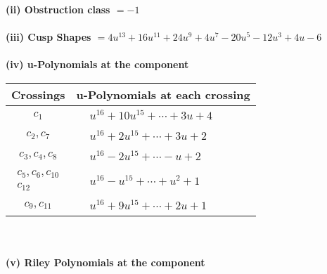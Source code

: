 \documentclass[1p]{elsarticle_modified}
\theoremstyle{definition}
\begin{document}
\flushleft \textbf{(ii) Obstruction class $= -1$}\\~\\
\flushleft \textbf{(iii) Cusp Shapes $= 4 u^{13}+16 u^{11}+24 u^9+4 u^7-20 u^5-12 u^3+4 u-6$}\\~\\
\newpage\renewcommand{\arraystretch}{1}
\flushleft \textbf{(iv) u-Polynomials at the component}\newline \\
\begin{tabular}{m{50pt}|m{274pt}}
Crossings & \hspace{64pt}u-Polynomials at each crossing \\
\hline $$\begin{aligned}c_{1}\end{aligned}$$&$\begin{aligned}
&u^{16}+10 u^{15}+\cdots+3 u+4
\end{aligned}$\\
\hline $$\begin{aligned}c_{2},c_{7}\end{aligned}$$&$\begin{aligned}
&u^{16}+2 u^{15}+\cdots+3 u+2
\end{aligned}$\\
\hline $$\begin{aligned}c_{3},c_{4},c_{8}\end{aligned}$$&$\begin{aligned}
&u^{16}-2 u^{15}+\cdots- u+2
\end{aligned}$\\
\hline $$\begin{aligned}c_{5},c_{6},c_{10}\\c_{12}\end{aligned}$$&$\begin{aligned}
&u^{16}- u^{15}+\cdots+u^2+1
\end{aligned}$\\
\hline $$\begin{aligned}c_{9},c_{11}\end{aligned}$$&$\begin{aligned}
&u^{16}+9 u^{15}+\cdots+2 u+1
\end{aligned}$\\
\hline
\end{tabular}\\~\\
\newpage\renewcommand{\arraystretch}{1}
\flushleft \textbf{(v) Riley Polynomials at the component}\newline \\
\end{document}
